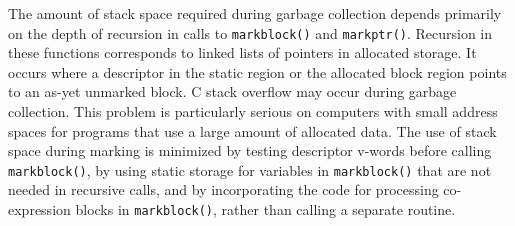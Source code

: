 \goodbreak
{}

The amount of stack space required during garbage collection depends
primarily on the depth of recursion in calls to \texttt{markblock()}
and \texttt{markptr()}. Recursion in these functions corresponds to
linked lists of pointers in allocated storage. It occurs where a
descriptor in the static region or the allocated block region points
to an as-yet unmarked block. C stack overflow may occur during garbage
collection. This problem is particularly serious on computers with
small address spaces for programs that use a large amount of allocated
data. The use of stack space during marking is minimized by testing
descriptor v-words before calling \texttt{markblock()}, by using
static storage for variables in \texttt{markblock()} that are not
needed in recursive calls, and by incorporating the code for
processing co-expression blocks in \texttt{markblock()}, rather than
calling a separate routine.

